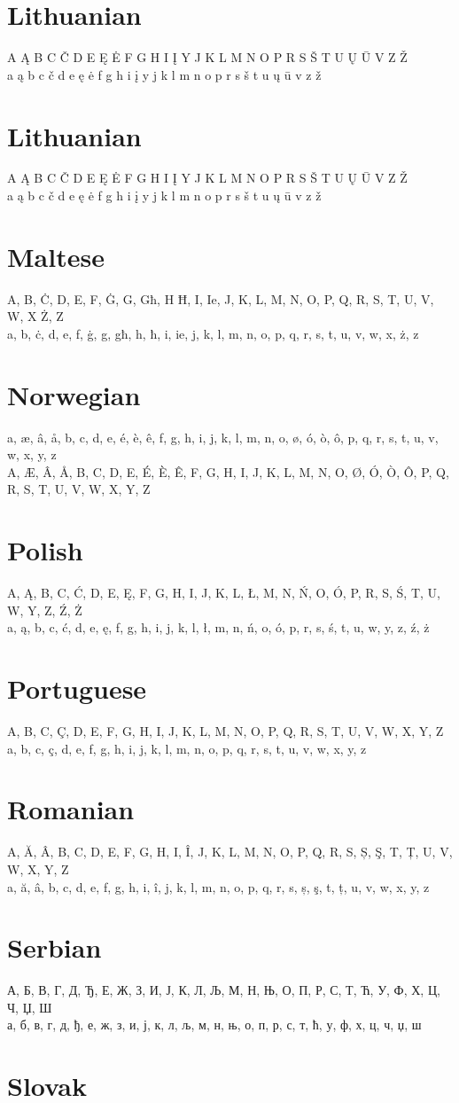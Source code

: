 \documentclass{article}
\begin{document}
\section{Lithuanian}
A Ą B C Č D E Ę Ė F G H I Į Y J K L M N O P R S Š T U Ų Ū V Z Ž \\
a ą b c č d e ę ė f g h i į y j k l m n o p r s š t u ų ū v z ž

\section{Lithuanian}
A Ą B C Č D E Ę Ė F G H I Į Y J K L M N O P R S Š T U Ų Ū V Z Ž \\
a ą b c č d e ę ė f g h i į y j k l m n o p r s š t u ų ū v z ž

\section{Maltese}
A, B, Ċ, D, E, F, Ġ, G, Għ, H Ħ, I, Ie, J, K, L, M, N, O, P, Q, R, S, T, U, V, W, X Ż, Z \\
a, b, ċ, d, e, f, ġ, g, għ, h, ħ, i, ie, j, k, l, m, n, o, p, q, r, s, t, u, v, w, x, ż, z

\section{Norwegian}
a, æ, â, å, b, c, d, e, é, è, ê, f, g, h, i, j, k, l, m, n, o, ø, ó, ò, ô, p, q, r, s, t, u, v, w, x, y, z \\
A, Æ, Â, Å, B, C, D, E, É, È, Ê, F, G, H, I, J, K, L, M, N, O, Ø, Ó, Ò, Ô, P, Q, R, S, T, U, V, W, X, Y, Z

\section{Polish}
A, Ą, B, C, Ć, D, E, Ę, F, G, H, I, J, K, L, Ł, M, N, Ń, O, Ó, P, R, S, Ś, T, U, W, Y, Z, Ź, Ż \\
a, ą, b, c, ć, d, e, ę, f, g, h, i, j, k, l, ł, m, n, ń, o, ó, p, r, s, ś, t, u, w, y, z, ź, ż

\section{Portuguese}
A, B, C, Ç, D, E, F, G, H, I, J, K, L, M, N, O, P, Q, R, S, T, U, V, W, X, Y,  Z \\
a, b, c, ç, d, e, f, g, h, i, j, k, l, m, n, o, p, q, r, s, t, u, v, w, x, y,  z

\section{Romanian}
A, Ă, Â, B, C, D, E, F, G, H, I, Î, J, K, L, M, N, O, P, Q, R, S, Ș, Ş, T, Ț, U, V, W, X, Y, Z \\
a, ă, â, b, c, d, e, f, g, h, i, î, j, k, l, m, n, o, p, q, r, s, ș, ş, t, ț, u, v, w, x, y, z

\section{Serbian}
А, Б, В, Г, Д, Ђ, Е, Ж, З, И, Ј, К, Л, Љ, М, Н, Њ, О, П, Р, С, Т, Ћ, У, Ф, Х, Ц, Ч, Џ, Ш \\
а, б, в, г, д, ђ, е, ж, з, и, ј, к, л, љ, м, н, њ, о, п, р, с, т, ћ, у, ф, х, ц, ч, џ, ш

\section{Slovak}
\end{document}
